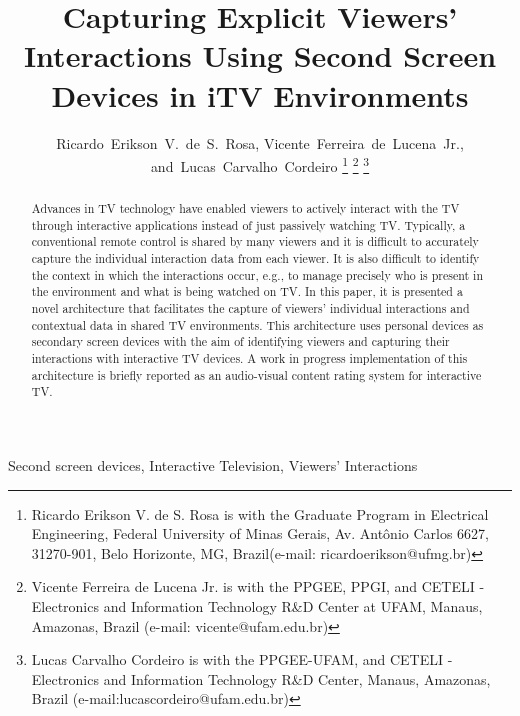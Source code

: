 \documentclass[journal]{IEEEtran}
\begin{document}
\title{Capturing Explicit Viewers' Interactions Using Second Screen Devices in iTV Environments}
\author{Ricardo~Erikson~V.~de~S.~Rosa, 
	Vicente~Ferreira~de~Lucena~Jr.,
	and~Lucas~Carvalho~Cordeiro
\thanks{Ricardo Erikson V. de S. Rosa is with the Graduate Program in Electrical Engineering, Federal University of Minas Gerais, Av. Antônio Carlos 6627, 31270-901, Belo Horizonte, MG, Brazil(e-mail: ricardoerikson@ufmg.br)}%
\thanks{Vicente Ferreira de Lucena Jr. is with the PPGEE, PPGI, and CETELI - Electronics and Information Technology R\&D Center at UFAM, Manaus, Amazonas, Brazil (e-mail: vicente@ufam.edu.br)}%
\thanks{Lucas Carvalho Cordeiro is with the PPGEE-UFAM, and CETELI - Electronics and Information Technology R\&D Center, Manaus, Amazonas, Brazil (e-mail:lucascordeiro@ufam.edu.br)}}

\maketitle

\begin{abstract}
Advances in TV technology have enabled viewers to actively interact with the TV through interactive applications instead of just passively watching TV. Typically, a conventional remote control is shared by many viewers and it is difficult to accurately capture the individual interaction data from each viewer. It is also difficult to identify the context in which the interactions occur, e.g., to manage precisely who is present in the environment and what is being watched on TV. In this paper, it is presented a novel architecture that facilitates the capture of viewers' individual interactions and contextual data in shared TV environments. This architecture uses personal devices as secondary screen devices with the aim of identifying viewers and capturing their interactions with interactive TV devices. A work in progress implementation of this architecture is briefly reported as an audio-visual content rating system for interactive TV.
\end{abstract}
\begin{IEEEkeywords}
Second screen devices, Interactive Television, Viewers' Interactions
\end{IEEEkeywords}
\IEEEpeerreviewmaketitle
\end{document}
